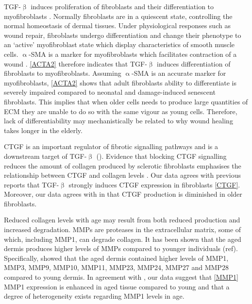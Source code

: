 \documentclass[alpha-refs]{wiley-article}
\newcommand{\tgf}{TGF-$\upbeta$}
\newcommand{\sma}{$\upalpha$-SMA}
\begin{document}
\tgf{} induces proliferation of fibroblasts and their differentiation to myofibroblasts \citep{Liu2016, Negmadjanov2015}. Normally fibroblasts are in a quiescent state, controlling the normal homeostasis of dermal tissues. Under physiological responses such as wound repair, fibroblasts undergo differentiation and change their phenotype to an `active' myofibroblast state which display characteristics of smooth muscle cells. \sma{} is a marker for myofibroblasts \citep{Zanotti2010, Evans2003} which facilitates contraction of a wound \citep{Darby2007}. \cref{ACTA2} therefore indicates that \tgf{} induces differentiation of fibroblasts to myofibroblasts. Assuming \sma{} is an accurate marker for myofibroblasts, \cref{ACTA2} shows that adult fibroblasts ability to differentiate is severely impaired compared to neonatal and damage-induced senescent fibroblasts. This implies that when older cells needs to produce large quantities of ECM they are unable to do so with the same vigour as young cells. Therefore, lack of differentiability may mechanistically be related to why wound healing takes longer in the elderly. 

CTGF is an important regulator of fibrotic signalling pathways and is a downstream target of \tgf{} (\cite{Quan2002, Wahab2005, Ponticos2009}). Evidence that blocking CTGF signalling reduces the amount of collagen produced by sclerotic fibroblasts emphasises the relationship between CTGF and collagen levels \citep{Makino2017, Sonnylal2010}. Our data agrees with previous reports that \tgf{} strongly induces CTGF expression in fibroblasts \cref{CTGF}. Moreover, our data agrees with \citep{Quan2010} in that CTGF production is diminished in older fibroblasts.

Reduced collagen levels with age may result from both reduced production and increased degradation. MMPs are proteases in the extracellular matrix, some of which, including MMP1, can degrade collagen. It has been shown that the aged dermis produces higher levels of MMPs compared to younger individuals (ref). Specifically, \citep{Qin2017} showed that the aged dermis contained higher levels of MMP1, MMP3, MMP9, MMP10, MMP11, MMP23, MMP24, MMP27 and MMP28 compared to young dermis. In agreement with \cite{Qin2017}, our data suggest that \cref{MMP1} MMP1 expression is enhanced in aged tissue compared to young and that a degree of heterogeneity exists regarding MMP1 levels in age. 
\end{document}
